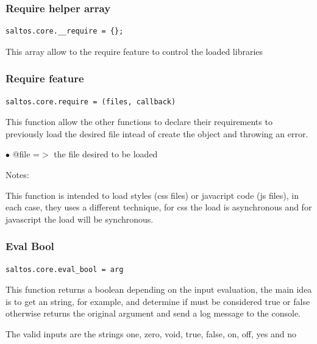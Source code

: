 \documentclass[a4paper]{article}
\begin{document}
\hypertarget{toc149}{}
\subsubsection{Require helper array}

\begin{lstlisting}
saltos.core.__require = {};
\end{lstlisting}

This array allow to the require feature to control the loaded libraries

\hypertarget{toc150}{}
\subsubsection{Require feature}

\begin{lstlisting}
saltos.core.require = (files, callback)
\end{lstlisting}

This function allow the other functions to declare their requirements to previously load the
desired file intead of create the object and throwing an error.

\begin{compactitem}
\item[\color{myblue}$\bullet$] @file =$>$ the file desired to be loaded
\end{compactitem}

Notes:

This function is intended to load styles (css files) or javacript code (js files), in each
case, they uses a different technique, for css the load is asynchronous and for javascript
the load will be synchronous.

\hypertarget{toc151}{}
\subsubsection{Eval Bool}

\begin{lstlisting}
saltos.core.eval_bool = arg
\end{lstlisting}

This function returns a boolean depending on the input evaluation, the main idea
is to get an string, for example, and determine if must be considered true or false
otherwise returns the original argument and send a log message to the console.

The valid inputs are the strings one, zero, void, true, false, on, off, yes and no
\end{document}
